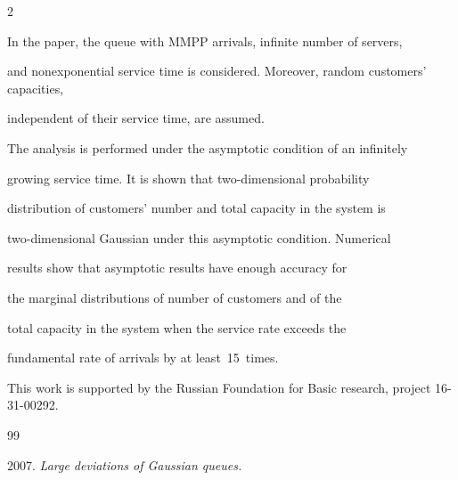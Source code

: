\begin{multicols}{2}
\noindent


In the paper, the queue with MMPP arrivals, infinite number of servers, 


and nonexponential service time is considered. Moreover, random customers' capacities, 


independent of their service time, are assumed.


The analysis is performed under the asymptotic condition of an infinitely 


growing service time. It is shown that two-dimensional probability 


distribution of customers' number and total capacity in the system is 


two-dimensional Gaussian under this asymptotic condition. Numerical 


results show that asymptotic results have enough accuracy for 


the marginal distributions of number of customers and of the 


total capacity in the system when the service rate exceeds the 


fundamental rate of arrivals by at least~15~times.





\vspace*{-6pt}





\Ack


\noindent


This work is supported by the Russian Foundation for Basic research, project 16-31-00292.





\renewcommand{\bibname}{\protect\rmfamily References}





\vspace*{-6pt}





{\small\frenchspacing


{%


\begin{thebibliography}{99}







 2007. \textit{Large deviations of Gaussian queues.} 



\end{thebibliography}}}
\end{multicols}
